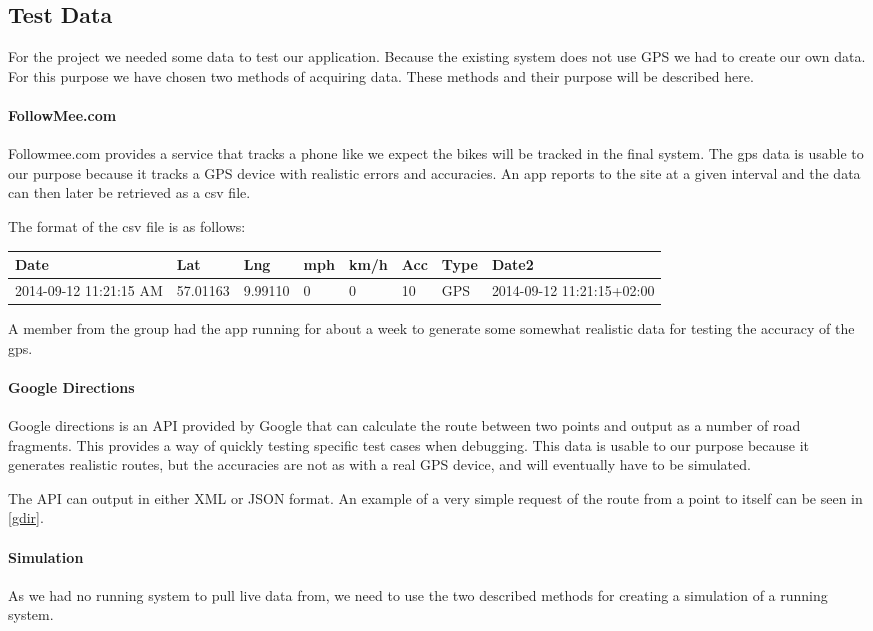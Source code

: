 \subsection{Test Data}

For the project we needed some data to test our application.
Because the existing system does not use GPS we had to create our own data.
For this purpose we have chosen two methods of acquiring data.
These methods and their purpose will be described here.

\paragraph{FollowMee.com}
Followmee.com provides a service that tracks a phone like we expect the bikes will be tracked in the final system.
The gps data is usable to our purpose because it tracks a GPS device with realistic errors and accuracies.
An app reports to the site at a given interval and the data can then later be retrieved as a csv file.

The format of the csv file is as follows:

\noindent
\begin{tabular}{| l l l l l l l l |}
\hline
Date & Lat & Lng & mph & km/h & Acc & Type & Date2\\
\hline
2014-09-12 11:21:15 AM&57.01163&9.99110&0&0&10&GPS&2014-09-12 11:21:15+02:00\\
\hline
\end{tabular}

A member from the group had the app running for about a week to generate some somewhat realistic data for testing the accuracy of the gps.

\paragraph{Google Directions}
Google directions is an API provided by Google that can calculate the route between two points and output as a number of road fragments.
This provides a way of quickly testing specific test cases when debugging.
This data is usable to our purpose because it generates realistic routes, but the accuracies are not as with a real GPS device, and will eventually have to be simulated.

The API can output in either XML or JSON format.
An example of a very simple request of the route from a point to itself can be seen in \cref{gdir}.

\paragraph{Simulation}
As we had no running system to pull live data from, we need to use the two described methods for creating a simulation of a running system.
